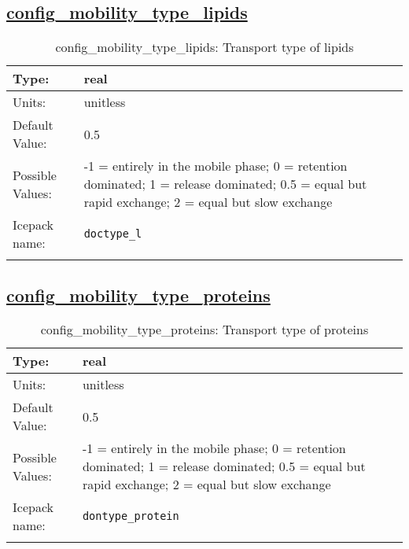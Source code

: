 \subsection[config\_mobility\_type\_lipids]{\hyperref[sec:nm_tab_biogeochemistry]{config\_mobility\_type\_lipids}}
\label{subsec:nm_sec_config_mobility_type_lipids}
\begin{center}
\begin{longtable}{| p{2.0in} || p{4.0in} |}
    \hline
    Type: & real \\
    \hline
    Units: & \si{unitless} \\
    \hline
    Default Value: & 0.5 \\
    \hline
    Possible Values: & -1 = entirely in the mobile phase; 0 = retention dominated; 1 = release dominated; 0.5 = equal but rapid exchange; 2 = equal but slow exchange \\
    \hline
    Icepack name: & \verb+doctype_l+ \\
    \hline
    \caption{config\_mobility\_type\_lipids: Transport type of lipids}
\end{longtable}
\end{center}
\subsection[config\_mobility\_type\_proteins]{\hyperref[sec:nm_tab_biogeochemistry]{config\_mobility\_type\_proteins}}
\label{subsec:nm_sec_config_mobility_type_proteins}
\begin{center}
\begin{longtable}{| p{2.0in} || p{4.0in} |}
    \hline
    Type: & real \\
    \hline
    Units: & \si{unitless} \\
    \hline
    Default Value: & 0.5 \\
    \hline
    Possible Values: & -1 = entirely in the mobile phase; 0 = retention dominated; 1 = release dominated; 0.5 = equal but rapid exchange; 2 = equal but slow exchange \\
    \hline
    Icepack name: & \verb+dontype_protein+ \\
    \hline
    \caption{config\_mobility\_type\_proteins: Transport type of proteins}
\end{longtable}
\end{center}
